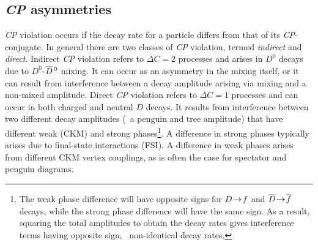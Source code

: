 \subsection{\emph{CP} asymmetries}\label{sec:cp_asym}

\emph{CP} violation occurs if the decay rate for a particle differs 
from that of its \emph{CP}-conjugate\cite{Bigi:2000yz}. 
In general there are two classes of \emph{CP} violation, termed
{\it indirect\/} and {\it direct\/}\cite{Nir:1999mg}. Indirect \emph{CP} 
violation refers to $\Delta C\!=\!2$ processes and 
arises in $D^0$ decays due to $D^0$-$\overline{D}{}^{\,0}$ mixing. 
It can occur as an asymmetry in the mixing itself, or it can 
result from interference between a decay 
amplitude arising via mixing and a non-mixed amplitude. 
Direct \emph{CP} violation refers to $\Delta C\!=\!1$
processes and can occur in both charged and neutral 
$D$ decays. It results from interference between two different decay
amplitudes (\eg\ a penguin and tree amplitude) that have
different weak (CKM) and strong phases\footnote{The weak 
phase difference will have opposite signs for $D\!\rightarrow\! f$ and 
$\overline{D}\ra\bar{f}$ decays, while the strong phase difference 
will have the same sign. As a result, squaring the total amplitudes 
to obtain the decay rates gives interference terms having 
opposite sign, \ie\ non-identical decay rates.}.
A difference in strong phases typically arises due to 
final-state interactions (FSI)\cite{Buccella:1994nf}. A difference
in weak phases arises from different CKM vertex couplings, as 
is often the case for spectator and penguin diagrams.

